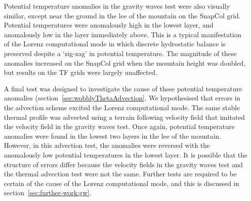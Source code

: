 Potential temperature anomalies in the gravity waves test were also visually similar, except near the ground in the lee of the mountain on the SnapCol grid.  Potential temperatures were anomalously high in the lowest layer, and anomalously low in the layer immediately above.  This is a typical manifestation of the Lorenz computational mode in which discrete hydrostatic balance is preserved despite a `zig-zag' in potential temperature.
The magnitude of these anomalies increased on the SnapCol grid when the mountain height was doubled, but results on the TF grids were largely unaffected.

A final test was designed to investigate the cause of these potential temperature anomalies (section~\ref{sec:wobblyThetaAdvection}.  We hypothesised that errors in the advection scheme excited the Lorenz computational mode.  The same stable thermal profile was advected using a terrain following velocity field that imitated the velocity field in the gravity waves test.  Once again, potential temperature anomalies were found in the lowest two layers in the lee of the mountain.  However, in this advection test, the anomalies were reversed with the anomalously low potential temperatures in the lowest layer.  It is possible that the structure of errors differ because the velocity fields in the gravity waves test and the thermal advection test were not the same.  Further tests are required to be certain of the cause of the Lorenz computational mode, and this is discussed in section~\ref{sec:further-work:gw}.
